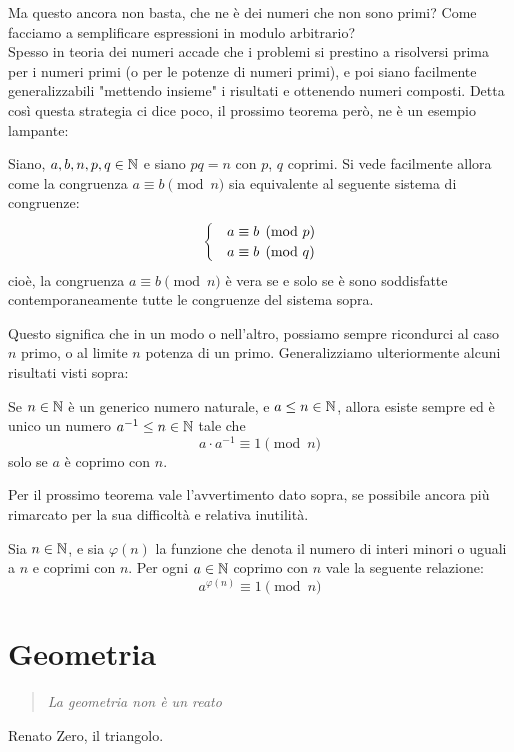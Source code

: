 \documentclass[11pt]{scrartcl}
\begin{document}
	Ma questo ancora non basta, che ne è dei numeri che non sono primi? Come facciamo a semplificare espressioni in modulo arbitrario? \\
	Spesso in teoria dei numeri accade che i problemi si prestino a risolversi prima per i numeri primi (o per le potenze di numeri primi), e poi siano facilmente generalizzabili "mettendo insieme" i risultati e ottenendo numeri composti. Detta così questa strategia ci dice poco, il prossimo teorema però, ne è un esempio lampante:
	\begin{theorem}
		Siano, $a,b,n,p,q\in\mathbb N$ e siano $pq=n$ con $p$, $q$ coprimi. Si vede facilmente allora come la congruenza $a \equiv b \pmod{n}$ sia equivalente al seguente sistema di congruenze:
		\begin{equation}\notag
			\begin{cases}
				&a \equiv b \pmod{p} \\
				&a \equiv b \pmod{q}
			\end{cases}
		\end{equation}
		cioè, la congruenza $a \equiv b \pmod{n}$ è vera se e solo se è sono soddisfatte contemporaneamente tutte le congruenze del sistema sopra.
	\end{theorem}
	Questo significa che in un modo o nell'altro, possiamo sempre ricondurci al caso $n$ primo, o al limite $n$ potenza di un primo.
	Generalizziamo ulteriormente alcuni risultati visti sopra:
	\begin{lemma}
		Se $n\in\mathbb N$ è un generico numero naturale, e $a\le n\in\mathbb N$, allora esiste sempre ed è unico un numero $a^{-1}\le n\in\mathbb N$ tale che 
		$$a\cdot a^{-1} \equiv 1 \pmod{n}$$
		solo se $a$ è coprimo con $n$. 
	\end{lemma}
	Per il prossimo teorema vale l'avvertimento dato sopra, se possibile ancora più rimarcato per la sua difficoltà e relativa inutilità.
	\begin{theorem}
		Sia $n\in\mathbb N$, e sia $\varphi(n)$ la funzione che denota il numero di interi minori o uguali a $n$ e coprimi con $n$. Per ogni $a\in\mathbb N$ coprimo con $n$ vale la seguente relazione:
		$$a^{\varphi(n)}\equiv 1 \pmod{n}$$
	\end{theorem}
	
	\newpage
	\section{Geometria}
	\begin{quote}
		\emph{La geometria non è un reato}
	\end{quote}
	Renato Zero, il triangolo.
\end{document}
